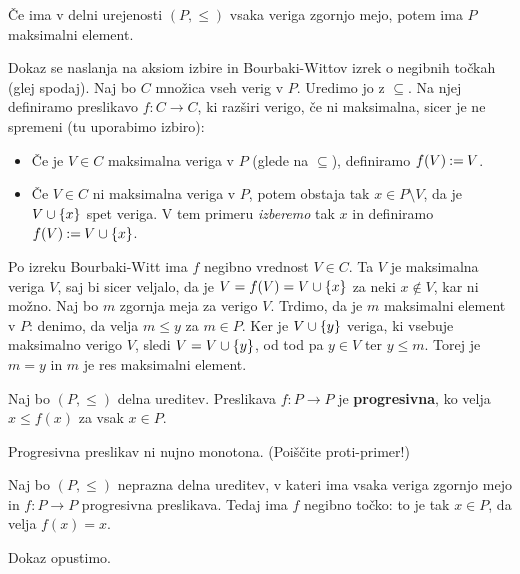 \begin{lema}
  Če ima v delni urejenosti $(P, {\leq})$ vsaka veriga zgornjo mejo,
  potem ima $P$ maksimalni element.
\end{lema}

\begin{dokaz}
  Dokaz se naslanja na aksiom izbire in Bourbaki-Wittov izrek o negibnih točkah (glej
  spodaj). Naj bo $C$ množica vseh verig v $P$. Uredimo jo z $\subseteq$. Na njej definiramo preslikavo
  $f : C \to C$, ki razširi verigo, če ni maksimalna, sicer je ne spremeni (tu uporabimo
  izbiro):
  \begin{itemize}
  \item Če je $V \in C$ maksimalna veriga v $P$ (glede na $\subseteq$), definiramo $f(V) \mathbin{{:}{=}} V$.
  \item Če $V \in C$ ni maksimalna veriga v $P$, potem obstaja tak $x \in P \setminus V$, da je $V
    \cup \left\{x\right\}$ spet veriga. V tem primeru \emph{izberemo} tak $x$ in definiramo $f(V) \mathbin{{:}{=}} V
    \cup \left\{x\right\}$.
  \end{itemize}
  Po izreku Bourbaki-Witt ima $f$ negibno vrednost $V \in C$. Ta $V$ je maksimalna
  veriga $V$, saj bi sicer veljalo, da je $V = f(V) = V \cup \left\{x\right\}$ za neki $x \not\in V$,
  kar ni možno. Naj bo $m$ zgornja meja za verigo $V$. Trdimo, da je $m$
  maksimalni element v $P$: denimo, da velja $m \leq y$ za $m \in P$. Ker je $V \cup \left\{y\right\}$
  veriga, ki vsebuje maksimalno verigo $V$, sledi $V = V \cup \left\{y\right\}$, od tod pa $y \in V$
  ter $y \leq m$. Torej je $m = y$ in $m$ je res maksimalni element.
\end{dokaz}

\begin{definicija}
  Naj bo $(P, \leq)$ delna ureditev. Preslikava $f : P \to P$ je \textbf{progresivna}, ko
  velja $x \leq f(x)$ za vsak $x \in P$.
\end{definicija}

\begin{opomba}
  Progresivna preslikav ni nujno monotona. (Poiščite proti-primer!)
\end{opomba}

\begin{izrek}
  Naj bo $(P, {\leq})$ neprazna delna ureditev, v kateri ima vsaka veriga zgornjo mejo in $f : P \to P$ progresivna
  preslikava. Tedaj ima $f$ negibno točko: to je tak $x \in P$, da velja $f(x) = x$.
\end{izrek}

\begin{dokaz}
  Dokaz opustimo.
\end{dokaz}


